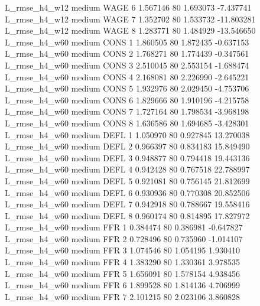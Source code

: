  L_rmse_h4_w12     medium     WAGE                 6  1.567146 80       1.693073          -7.437741
 L_rmse_h4_w12     medium     WAGE                 7  1.352702 80       1.533732         -11.803281
 L_rmse_h4_w12     medium     WAGE                 8  1.283771 80       1.484929         -13.546650
 L_rmse_h4_w60     medium     CONS                 1  1.860505 80       1.872435          -0.637153
 L_rmse_h4_w60     medium     CONS                 2  1.768271 80       1.774439          -0.347561
 L_rmse_h4_w60     medium     CONS                 3  2.510045 80       2.553154          -1.688474
 L_rmse_h4_w60     medium     CONS                 4  2.168081 80       2.226990          -2.645221
 L_rmse_h4_w60     medium     CONS                 5  1.932976 80       2.029450          -4.753706
 L_rmse_h4_w60     medium     CONS                 6  1.829666 80       1.910196          -4.215758
 L_rmse_h4_w60     medium     CONS                 7  1.727164 80       1.798534          -3.968198
 L_rmse_h4_w60     medium     CONS                 8  1.636586 80       1.694685          -3.428301
 L_rmse_h4_w60     medium     DEFL                 1  1.050970 80       0.927845          13.270038
 L_rmse_h4_w60     medium     DEFL                 2  0.966397 80       0.834183          15.849490
 L_rmse_h4_w60     medium     DEFL                 3  0.948877 80       0.794418          19.443136
 L_rmse_h4_w60     medium     DEFL                 4  0.942428 80       0.767518          22.788997
 L_rmse_h4_w60     medium     DEFL                 5  0.921081 80       0.756145          21.812699
 L_rmse_h4_w60     medium     DEFL                 6  0.930936 80       0.770308          20.852506
 L_rmse_h4_w60     medium     DEFL                 7  0.942918 80       0.788667          19.558416
 L_rmse_h4_w60     medium     DEFL                 8  0.960174 80       0.814895          17.827972
 L_rmse_h4_w60     medium      FFR                 1  0.384474 80       0.386981          -0.647827
 L_rmse_h4_w60     medium      FFR                 2  0.728496 80       0.735960          -1.014107
 L_rmse_h4_w60     medium      FFR                 3  1.074546 80       1.054195           1.930410
 L_rmse_h4_w60     medium      FFR                 4  1.383290 80       1.330361           3.978535
 L_rmse_h4_w60     medium      FFR                 5  1.656091 80       1.578154           4.938456
 L_rmse_h4_w60     medium      FFR                 6  1.899528 80       1.814136           4.706999
 L_rmse_h4_w60     medium      FFR                 7  2.101215 80       2.023106           3.860828

